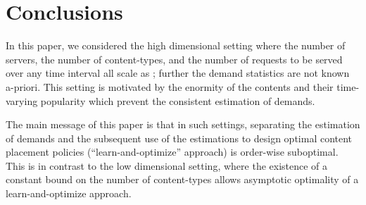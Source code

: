 \documentclass[10pt, conference, letterpaper]{IEEEtran}
\begin{document}
\section{Conclusions}\label{conclusion}
In this paper, we considered the high dimensional setting where the
number of servers, the number of content-types, and the number of
requests to be served over any time interval all scale as ;
further the demand statistics are not known a-priori. This setting is
motivated by the enormity of the contents and their time-varying
popularity which prevent the consistent estimation of demands.

The main message of this paper is that in such settings, separating
the estimation of demands and the subsequent use of the estimations to
design optimal content placement policies (``learn-and-optimize''
approach) is order-wise suboptimal. This is in contrast to the
low dimensional setting, where the existence of a constant bound on the
number of content-types allows asymptotic optimality of a
learn-and-optimize approach.






\end{document}
